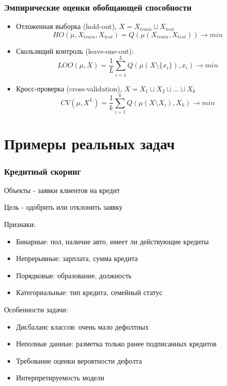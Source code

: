 \documentclass{beamer}
\begin{document}
	\begin{frame}
		\frametitle{Эмпирические оценки обобщающей способности}
		\begin{itemize}
			\item Отложенная выборка (hold-out), $X = X_{train} \sqcup X_{test}$
			$$
			HO(\mu, X_{train}, X_{test}) = Q(\mu(X_{train}, X_{test})) \to min
			$$
			
			\item Скользящий контроль (leave-one-out):
			$$
			LOO(\mu, X) = \frac{1}{L} \sum_{i=1}^{L} Q(\mu(X \setminus \{x_i\}), x_i) \to min
			$$
			
			\item Кросс-проверка (cross-validation), 
			$X = X_1 \sqcup X_2 \sqcup ... \sqcup X_k$
			$$
			CV(\mu, X^{L}) = \frac{1}{k} \sum_{i=1}^{k} Q(\mu(X \setminus X_{i}), X_{k}) \to min
			$$
		\end{itemize}
	\end{frame}
	
	\section{Примеры реальных задач}
	
	
	\begin{frame}
		\frametitle{Кредитный скоринг}
		Объекты - заявки клиентов на кредит
		
		Цель - одобрить или отклонить заявку
		
		Признаки:
		\begin{itemize}
			\item Бинарные: пол, наличие авто, имеет ли действующие кредиты
			\item Непрерывные: зарплата, сумма кредита
			\item Порядковые: образование, должность
			\item Категориальные: тип кредита, семейный статус
		\end{itemize}
	
		Особенности задачи:
		\begin{itemize}
			\item Дисбаланс классов: очень мало дефолтных
			\item Неполные данные: разметка только ранее подписанных кредитов
			\item Требование оценки вероятности дефолта
			\item Интерпретируемость модели
		\end{itemize}
	\end{frame}
	
\end{document}
